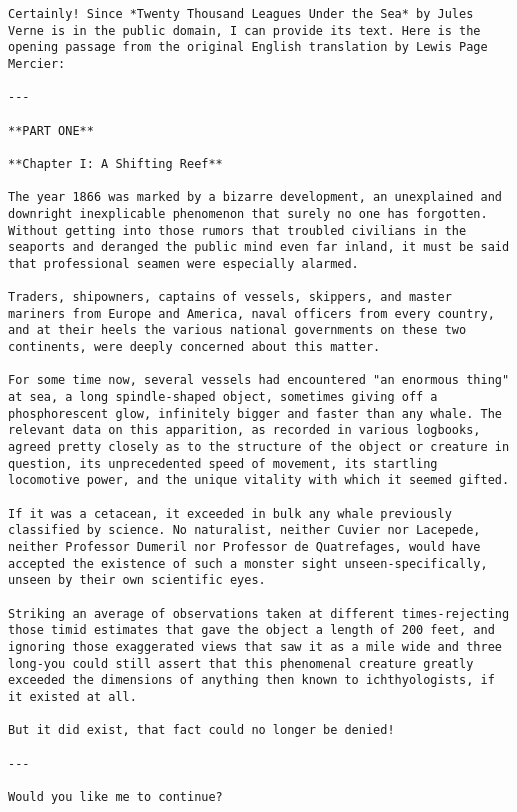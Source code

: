 \documentclass{article}
\begin{document}
	\begin{lstlisting}
Certainly! Since *Twenty Thousand Leagues Under the Sea* by Jules Verne is in the public domain, I can provide its text. Here is the opening passage from the original English translation by Lewis Page Mercier:

---

**PART ONE**

**Chapter I: A Shifting Reef**

The year 1866 was marked by a bizarre development, an unexplained and downright inexplicable phenomenon that surely no one has forgotten. Without getting into those rumors that troubled civilians in the seaports and deranged the public mind even far inland, it must be said that professional seamen were especially alarmed.

Traders, shipowners, captains of vessels, skippers, and master mariners from Europe and America, naval officers from every country, and at their heels the various national governments on these two continents, were deeply concerned about this matter.

For some time now, several vessels had encountered "an enormous thing" at sea, a long spindle-shaped object, sometimes giving off a phosphorescent glow, infinitely bigger and faster than any whale. The relevant data on this apparition, as recorded in various logbooks, agreed pretty closely as to the structure of the object or creature in question, its unprecedented speed of movement, its startling locomotive power, and the unique vitality with which it seemed gifted.

If it was a cetacean, it exceeded in bulk any whale previously classified by science. No naturalist, neither Cuvier nor Lacepede, neither Professor Dumeril nor Professor de Quatrefages, would have accepted the existence of such a monster sight unseen-specifically, unseen by their own scientific eyes.

Striking an average of observations taken at different times-rejecting those timid estimates that gave the object a length of 200 feet, and ignoring those exaggerated views that saw it as a mile wide and three long-you could still assert that this phenomenal creature greatly exceeded the dimensions of anything then known to ichthyologists, if it existed at all.

But it did exist, that fact could no longer be denied!

---

Would you like me to continue?
	\end{lstlisting}
\end{document}

